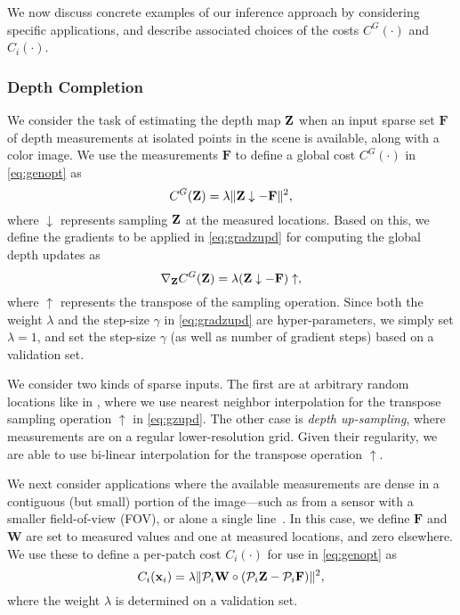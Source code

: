 \documentclass[10pt,twocolumn,letterpaper]{article}
\begin{document}
We now discuss concrete examples of our inference approach by considering specific applications, and describe associated choices of the costs $C^G(\cdot)$ and $C_i(\cdot)$.

\subsubsection{Depth Completion}
 We consider the task of estimating the depth map $\mathbf{Z}$ when an input sparse set $\mathbf{F}$ of depth measurements  at isolated points in the scene is available, along with a color image. We use the measurements $\mathbf{F}$ to define a global cost $C^G(\cdot)$ in \eqref{eq:genopt} as
\begin{equation}
  \label{eq:cgmeasure}
  C^G(\mathbf{Z}) = \lambda \|\mathbf{Z}\downarrow - \mathbf{F}\|^2,
\end{equation}
where $\downarrow$ represents sampling $\mathbf{Z}$ at the measured locations. Based on this, we define the gradients to be applied in \eqref{eq:gradzupd} for computing the global depth updates as
\begin{equation}
  \label{eq:gzupd}
  \nabla_{\mathbf{Z}}C^G(\mathbf{Z}) = \lambda (\mathbf{Z}\downarrow - \mathbf{F})\uparrow,
\end{equation}
where $\uparrow$ represents the transpose of the sampling operation. Since both the weight $\lambda$ and the step-size $\gamma$ in \eqref{eq:gradzupd} are hyper-parameters, we simply set $\lambda=1$, and set the step-size $\gamma$ (as well as number of gradient steps) based on a validation set.

We consider two kinds of sparse inputs. The first are at arbitrary random locations like in \cite{van2019sparse,ma2018sparse,jaritz2018sparse,wang2019plug,shivakumar2019dfusenet}, where we use nearest neighbor interpolation for the transpose sampling operation $\uparrow$  in \eqref{eq:gzupd}. The other case is \emph{depth up-sampling}, where measurements are on a regular lower-resolution grid. Given their regularity, we are able to use bi-linear interpolation for the transpose operation $\uparrow$. 


 We next consider applications where the available measurements are dense in a contiguous (but small) portion of the image---such as from a sensor with a smaller field-of-view (FOV), or alone a single line~\cite{liao2017sparse}. In this case, we define $\mathbf{F}$ and $\mathbf{W}$ are set to measured values and one at measured locations, and zero elsewhere. We use these to define a per-patch cost $C_i(\cdot)$ for use in \eqref{eq:genopt} as
\begin{equation}
  \label{eq:uccost}
  C_i(\mathbf{x}{}_i) = \lambda \|\mathcal{P}_i{}\mathbf{W}\circ(\mathcal{P}_i{}\mathbf{Z} - \mathcal{P}_i{}\mathbf{F})\|^2,
\end{equation}
where the weight $\lambda$ is determined on a validation set.
\end{document}
